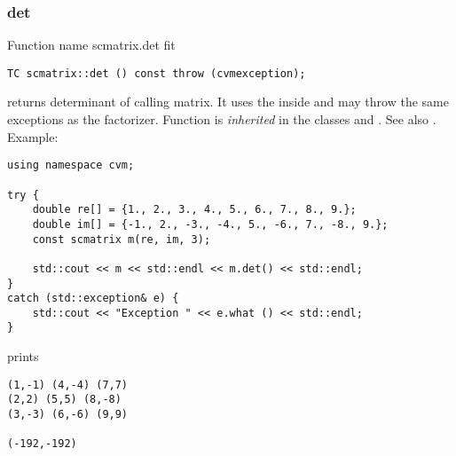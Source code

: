 \subsubsection{det}
Function%
\pdfdest name {scmatrix.det} fit
\begin{verbatim}
TC scmatrix::det () const throw (cvmexception);
\end{verbatim}
returns  determinant of  calling matrix.
It uses the  inside
and may throw the same exceptions as the factorizer.
Function is \emph{inherited} in the classes
and .
See also
.
Example:
\begin{Verbatim}
using namespace cvm;

try {
    double re[] = {1., 2., 3., 4., 5., 6., 7., 8., 9.};
    double im[] = {-1., 2., -3., -4., 5., -6., 7., -8., 9.};
    const scmatrix m(re, im, 3);

    std::cout << m << std::endl << m.det() << std::endl;
}
catch (std::exception& e) {
    std::cout << "Exception " << e.what () << std::endl;
}
\end{Verbatim}
prints
\begin{Verbatim}
(1,-1) (4,-4) (7,7)
(2,2) (5,5) (8,-8)
(3,-3) (6,-6) (9,9)

(-192,-192)
\end{Verbatim}
\newpage



